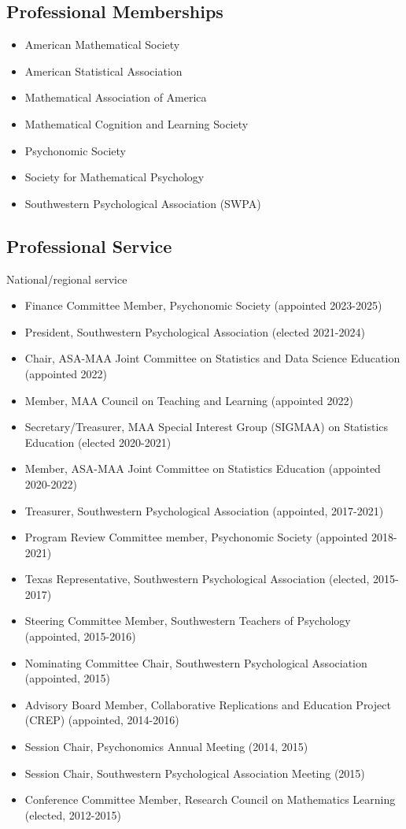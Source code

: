 \documentclass[article,10pt]{article}
\begin{document}
\subsection*{Professional Memberships}
\label{sec:orgdffa19e}
\begin{itemize}
\item American Mathematical Society
\item American Statistical Association
\item Mathematical Association of America
\item Mathematical Cognition and Learning Society
\item Psychonomic Society
\item Society for Mathematical Psychology
\item Southwestern Psychological Association (SWPA)
\end{itemize}

\subsection*{Professional Service}
\label{sec:orgdb02bce}

National/regional service 

\begin{itemize}
\item Finance Committee Member, Psychonomic Society (appointed 2023-2025)
\item President, Southwestern Psychological Association (elected 2021-2024)
\item Chair, ASA-MAA Joint Committee on Statistics and Data Science Education (appointed 2022)
\item Member, MAA Council on Teaching and Learning (appointed 2022)
\item Secretary/Treasurer, MAA Special Interest Group (SIGMAA) on Statistics Education (elected 2020-2021)
\item Member, ASA-MAA Joint Committee on Statistics Education (appointed 2020-2022)
\item Treasurer, Southwestern Psychological Association (appointed, 2017-2021)
\item Program Review Committee member, Psychonomic Society (appointed 2018-2021)
\item Texas Representative, Southwestern Psychological Association (elected, 2015-2017)
\item Steering Committee Member, Southwestern Teachers of Psychology (appointed, 2015-2016)
\item Nominating Committee Chair, Southwestern Psychological Association (appointed, 2015)
\item Advisory Board Member, Collaborative Replications and Education Project (CREP) (appointed, 2014-2016)
\item Session Chair, Psychonomics Annual Meeting (2014, 2015)
\item Session Chair, Southwestern Psychological Association Meeting (2015)
\item Conference Committee Member, Research Council on Mathematics Learning (elected, 2012-2015)
\end{itemize}
\end{document}

